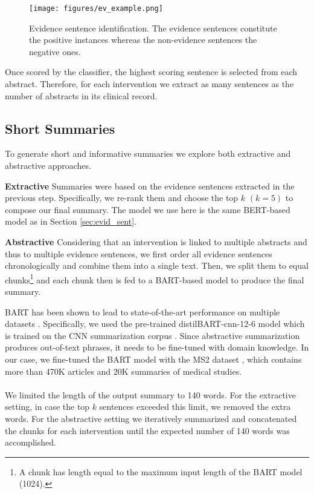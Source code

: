 \documentclass[11pt]{article}
\begin{document}
\begin{figure}[ht!]
    \centering
    \texttt{[image: figures/ev\_example.png]}
    \caption{Evidence sentence identification. The evidence sentences constitute the positive instances whereas the non-evidence sentences the negative ones.}
    \label{fig:ev_example}
\end{figure}

Once scored by the classifier, the highest scoring sentence is selected from each abstract. Therefore, for each intervention we extract as many sentences as the number of abstracts in its clinical record. 


\subsection{Short Summaries}
To generate short and informative summaries we explore both extractive and abstractive approaches.

\textbf{Extractive}
Summaries were based on the evidence sentences extracted in the previous step. Specifically, we re-rank them and choose the top $k$ $(k=5)$ to compose our final summary. The model we use here is the same BERT-based model as in Section \ref{sec:evid_sent}.


\textbf{Abstractive}
Considering that an intervention is linked to multiple abstracts and thus to multiple evidence sentences, we first order all evidence sentences chronologically and combine them into a single text. Then, we split them to equal chunks\footnote{A chunk has length equal to the maximum input length of the BART model (1024).} and each chunk then is fed to a BART-based model to produce the final summary.

BART has been shown to lead to state-of-the-art performance on multiple datasets \cite{fabbri2021summeval}. Specifically, we used the pre-trained distilBART-cnn-12-6 model which is trained on the CNN summarization corpus \cite{cnntext}. Since abstractive summarization produces out-of-text phrases, it needs to be fine-tuned with domain knowledge. In our case, we fine-tuned the BART model with the MS2 dataset \cite{deyoung2021ms2}, which contains more than 470K articles and 20K summaries of medical studies. 
\paragraph{}
We limited the length of the output summary to 140 words.  For the extractive setting, in case the top $k$ sentences exceeded this limit, we removed the extra words. For the abstractive setting we iteratively summarized and concatenated the chunks for each intervention until the expected number of 140 words was accomplished.
\end{document}
